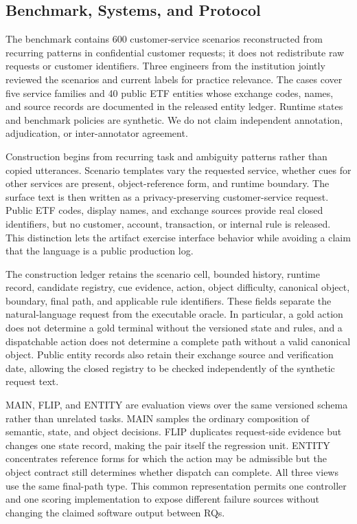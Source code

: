 \documentclass[10pt,conference,a4paper]{IEEEtran}
\begin{document}
\subsection{Benchmark, Systems, and Protocol}

The benchmark contains 600 customer-service scenarios reconstructed from recurring patterns in confidential customer requests; it does not redistribute raw requests or customer identifiers. Three engineers from the institution jointly reviewed the scenarios and current labels for practice relevance. The cases cover five service families and 40 public ETF entities whose exchange codes, names, and source records are documented in the released entity ledger. Runtime states and benchmark policies are synthetic. We do not claim independent annotation, adjudication, or inter-annotator agreement.

Construction begins from recurring task and ambiguity patterns rather than copied utterances. Scenario templates vary the requested service, whether cues for other services are present, object-reference form, and runtime boundary. The surface text is then written as a privacy-preserving customer-service request. Public ETF codes, display names, and exchange sources provide real closed identifiers, but no customer, account, transaction, or internal rule is released. This distinction lets the artifact exercise interface behavior while avoiding a claim that the language is a public production log.

The construction ledger retains the scenario cell, bounded history, runtime record, candidate registry, cue evidence, action, object difficulty, canonical object, boundary, final path, and applicable rule identifiers. These fields separate the natural-language request from the executable oracle. In particular, a gold action does not determine a gold terminal without the versioned state and rules, and a dispatchable action does not determine a complete path without a valid canonical object. Public entity records also retain their exchange source and verification date, allowing the closed registry to be checked independently of the synthetic request text.

MAIN, FLIP, and ENTITY are evaluation views over the same versioned schema rather than unrelated tasks. MAIN samples the ordinary composition of semantic, state, and object decisions. FLIP duplicates request-side evidence but changes one state record, making the pair itself the regression unit. ENTITY concentrates reference forms for which the action may be admissible but the object contract still determines whether dispatch can complete. All three views use the same final-path type. This common representation permits one controller and one scoring implementation to expose different failure sources without changing the claimed software output between RQs.
\end{document}
